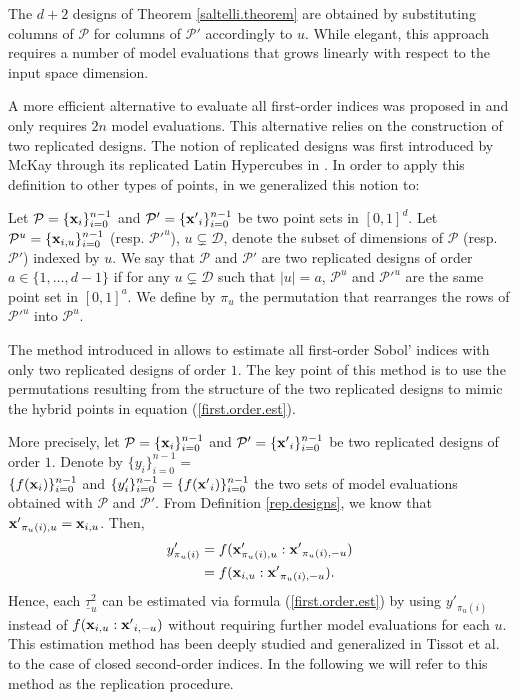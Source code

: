 The $d+2$ designs of Theorem \ref{saltelli.theorem} are obtained by substituting columns of $\mathcal{P}$ for columns of $\mathcal{P}'$ accordingly to $u$. While elegant, this approach requires a number of model evaluations that grows linearly with respect to the input space dimension.

A more efficient alternative to evaluate all first-order indices was proposed in \cite{Mara} and only requires $2n$ model evaluations. This alternative relies on the construction of two replicated designs. The notion of replicated designs was first introduced by McKay through its replicated Latin Hypercubes in \cite{McKay}. In order to apply this definition to other types of points, in \cite{GJAHMP} we generalized this notion to:
\begin{definition}
\label{rep.designs}
Let $\mathcal{P}=\{\boldsymbol{\mathbf{x}}_i\}_{i=0}^{n-1}$ and $\mathcal{P}'=\{{\boldsymbol{\mathbf{x}}'}_i\}_{i=0}^{n-1}$ be two point sets in
$[0,1]^{d}$. Let $\mathcal{P}^u=\{\boldsymbol{\mathbf{x}}_{i,u}\}_{i=0}^{n-1}$ (resp. ${\mathcal{P}'}^u$), $u \subsetneq \mathcal{D}$, denote the subset of dimensions of $\mathcal{P}$ (resp. $\mathcal{P}'$) indexed by $u$. We say that $\mathcal{P}$ and $\mathcal{P}'$ are two replicated designs of order $a \in \{1,\dots,d-1\}$ if for any $u \subsetneq \mathcal{D}$ such that $|u|=a$, $\mathcal{P}^u$ and ${\mathcal{P}'}^u$ are the same point set in $[0,1]^a$. We define by $\pi_u$ the permutation that rearranges the rows of ${\mathcal{P}'}^u$ into $\mathcal{P}^u$.
\end{definition}
The method introduced in \cite{Mara} allows to estimate all first-order Sobol' indices with only two replicated designs of order $1$. The key point of this method is to use the permutations resulting from the structure of the two replicated designs to mimic the hybrid points in equation (\ref{first.order.est}). 

More precisely, let $\mathcal{P}=\{\boldsymbol{\mathbf{x}}_i\}_{i=0}^{n-1}$ and $\mathcal{P}'=\{{\boldsymbol{\mathbf{x}}'}_i\}_{i=0}^{n-1}$ be two replicated designs of order $1$. Denote by $\{y_i\}_{i=0}^{n-1}=$\\$\{f(\boldsymbol{\mathbf{x}}_i)\}_{i=0}^{n-1}$ and $\{y'_i\}_{i=0}^{n-1}=\{f({\boldsymbol{\mathbf{x}}'}_i)\}_{i=0}^{n-1}$ the two sets of model evaluations obtained with $\mathcal{P}$ and $\mathcal{P}'$. From Definition \ref{rep.designs}, we know that ${\boldsymbol{\mathbf{x}}'}_{\pi_u(i),u}={\boldsymbol{\mathbf{x}}}_{i,u}$. Then,
\begin{align*}
y'_{\pi_u(i)}&= f(\boldsymbol{\mathbf{x}}'_{\pi_u(i),u}:{\boldsymbol{\mathbf{x}}'}_{\pi_u(i),-u}) \\
&= f(\boldsymbol{\mathbf{x}}_{i,u}:{\boldsymbol{\mathbf{x}}'}_{\pi_u(i),-u}).
\end{align*}
Hence, each $\underline{\tau}^2_u$ can be estimated via formula (\ref{first.order.est}) by using $y'_{\pi_u(i)}$ instead of $f(\boldsymbol{\mathbf{x}}_{i,u}:{\boldsymbol{\mathbf{x}}'}_{i,-u})$ without requiring further model evaluations for each $u$. This estimation method has been deeply studied and generalized in Tissot et al. \cite{Tissot} to the case of closed second-order indices. In the following we will refer to this method as the replication procedure.

